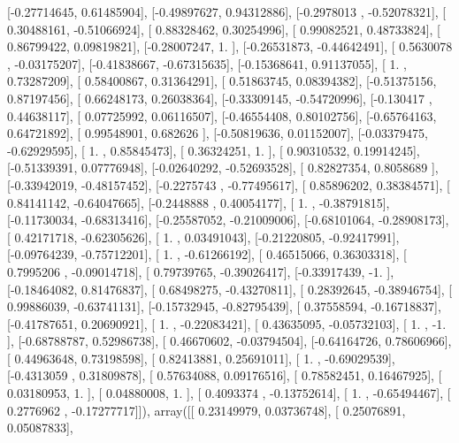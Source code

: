 \documentclass{article}
\begin{document}
       [-0.27714645,  0.61485904],
       [-0.49897627,  0.94312886],
       [-0.2978013 , -0.52078321],
       [ 0.30488161, -0.51066924],
       [ 0.88328462,  0.30254996],
       [ 0.99082521,  0.48733824],
       [ 0.86799422,  0.09819821],
       [-0.28007247,  1.        ],
       [-0.26531873, -0.44642491],
       [ 0.5630078 , -0.03175207],
       [-0.41838667, -0.67315635],
       [-0.15368641,  0.91137055],
       [ 1.        ,  0.73287209],
       [ 0.58400867,  0.31364291],
       [ 0.51863745,  0.08394382],
       [-0.51375156,  0.87197456],
       [ 0.66248173,  0.26038364],
       [-0.33309145, -0.54720996],
       [-0.130417  ,  0.44638117],
       [ 0.07725992,  0.06116507],
       [-0.46554408,  0.80102756],
       [-0.65764163,  0.64721892],
       [ 0.99548901,  0.682626  ],
       [-0.50819636,  0.01152007],
       [-0.03379475, -0.62929595],
       [ 1.        ,  0.85845473],
       [ 0.36324251,  1.        ],
       [ 0.90310532,  0.19914245],
       [-0.51339391,  0.07776948],
       [-0.02640292, -0.52693528],
       [ 0.82827354,  0.8058689 ],
       [-0.33942019, -0.48157452],
       [-0.2275743 , -0.77495617],
       [ 0.85896202,  0.38384571],
       [ 0.84141142, -0.64047665],
       [-0.2448888 ,  0.40054177],
       [ 1.        , -0.38791815],
       [-0.11730034, -0.68313416],
       [-0.25587052, -0.21009006],
       [-0.68101064, -0.28908173],
       [ 0.42171718, -0.62305626],
       [ 1.        ,  0.03491043],
       [-0.21220805, -0.92417991],
       [-0.09764239, -0.75712201],
       [ 1.        , -0.61266192],
       [ 0.46515066,  0.36303318],
       [ 0.7995206 , -0.09014718],
       [ 0.79739765, -0.39026417],
       [-0.33917439, -1.        ],
       [-0.18464082,  0.81476837],
       [ 0.68498275, -0.43270811],
       [ 0.28392645, -0.38946754],
       [ 0.99886039, -0.63741131],
       [-0.15732945, -0.82795439],
       [ 0.37558594, -0.16718837],
       [-0.41787651,  0.20690921],
       [ 1.        , -0.22083421],
       [ 0.43635095, -0.05732103],
       [ 1.        , -1.        ],
       [-0.68788787,  0.52986738],
       [ 0.46670602, -0.03794504],
       [-0.64164726,  0.78606966],
       [ 0.44963648,  0.73198598],
       [ 0.82413881,  0.25691011],
       [ 1.        , -0.69029539],
       [-0.4313059 ,  0.31809878],
       [ 0.57634088,  0.09176516],
       [ 0.78582451,  0.16467925],
       [ 0.03180953,  1.        ],
       [ 0.04880008,  1.        ],
       [ 0.4093374 , -0.13752614],
       [ 1.        , -0.65494467],
       [ 0.2776962 , -0.17277717]]), array([[ 0.23149979,  0.03736748],
       [ 0.25076891,  0.05087833],
\end{document}
